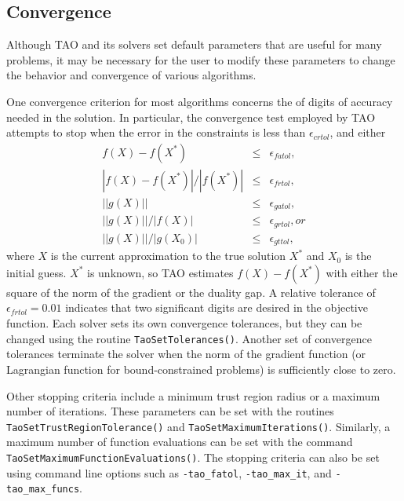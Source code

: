 \subsection{Convergence}\label{sec:customize}

Although TAO and its solvers set default parameters that are useful
for many problems, it may be necessary for the user to modify these
parameters to change the behavior and convergence of various algorithms.

One convergence criterion for most algorithms concerns the
of digits of accuracy needed in the solution.  In particular,
the convergence test employed by TAO attempts to stop when
the error in the constraints is less than $\epsilon_{crtol}$,
and either
\[
\begin{array}{lcl}
f(X) - f(X^*)  &\leq& \epsilon_{fatol}, \\
|f(X) - f(X^*)| / |f(X^*)| &\leq& \epsilon_{frtol},\\
||g(X)|| &\leq& \epsilon_{gatol}, \\
||g(X)||/|f(X)| &\leq& \epsilon_{grtol}, or \\
||g(X)||/|g(X_0)| &\leq& \epsilon_{gttol},
\end{array}
\]
where $X$ is the current approximation to the true solution $X^*$
and $X_0$ is the initial guess.
$X^*$ is unknown, so TAO estimates $f(X) - f(X^*)$ with either 
the square of the norm of the gradient or the duality gap.
A relative tolerance of $\epsilon_{frtol}=0.01$ indicates that two
significant digits are desired in the objective function.
Each solver sets its own  convergence tolerances, but they can
be changed using the routine
{\tt TaoSetTolerances()}.
Another set of convergence tolerances 
terminate the solver when the norm of the gradient function
(or Lagrangian function for bound-constrained problems)
is sufficiently close to zero.

Other stopping criteria include a minimum trust region radius or 
a maximum number of iterations.  These parameters can be set with
the routines {\tt Tao\-Set\-Trust\-Region\-Tolerance()}
and {\tt Tao\-Set\-Max\-imum\-Iter\-ations()}.
Similarly, a maximum number of function evaluations can be set 
with the command 
{\tt Tao\-Set\-Max\-imum\-Func\-tion\-Evaluations()}.
The stopping criteria can
also be set using command line options such as \texttt{-tao\_fatol}, 
\texttt{-tao\_max\_it}, and \texttt{-tao\_max\_funcs}.

